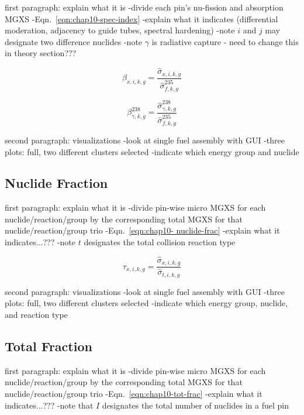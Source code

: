 first paragraph: explain what it is
-divide each pin's nu-fission and absorption \ac{MGXS} 
-Eqn.~\ref{eqn:chap10-spec-index}
-explain what it indicates (differential moderation, adjacency to guide tubes, spectral hardening)
-note $i$ and $j$ may designate two difference nuclides
-note $\gamma$ is radiative capture - need to change this in theory section???

\begin{equation}
\label{eqn:chap10-spec-index-general}
\beta_{x,i,k,g} = \frac{\hat{\sigma}_{x,i,k,g}}{\hat{\sigma}_{f,k,g}^{235}}
\end{equation}

\begin{equation}
\label{eqn:chap10-spec-index-u238-capt}
\beta_{\gamma,k,g}^{238} = \frac{\hat{\sigma}_{\gamma,k,g}^{238}}{\hat{\sigma}_{f,k,g}^{235}}
\end{equation}

second paragraph: visualizations
-look at single fuel assembly with GUI
-three plots: full, two different clusters selected
-indicate which energy group and nuclide

\subsection{Nuclide Fraction}
\label{subsec:chap10-nuclide-frac}

first paragraph: explain what it is
-divide pin-wise micro \ac{MGXS} for each nuclide/reaction/group by the corresponding total \ac{MGXS} for that nuclide/reaction/group trio
-Eqn.~\ref{eqn:chap10- nuclide-frac}
-explain what it indicates...???
-note $t$ designates the total collision reaction type

\begin{equation}
\label{eqn:chap10-nuclide-frac}
\tau_{x,i,k,g} = \frac{\hat{\sigma}_{x,i,k,g}}{\hat{\sigma}_{t,i,k,g}}
\end{equation}

second paragraph: visualizations
-look at single fuel assembly with GUI
-three plots: full, two different clusters selected
-indicate which energy group, nuclide, and reaction type

\subsection{Total Fraction}
\label{subsec:chap10-tot-frac}

first paragraph: explain what it is
-divide pin-wise micro \ac{MGXS} for each nuclide/reaction/group by the corresponding total \ac{MGXS} for that nuclide/reaction/group trio
-Eqn.~\ref{eqn:chap10-tot-frac}
-explain what it indicates...???
-note that $I$ designates the total number of nuclides in a fuel pin

